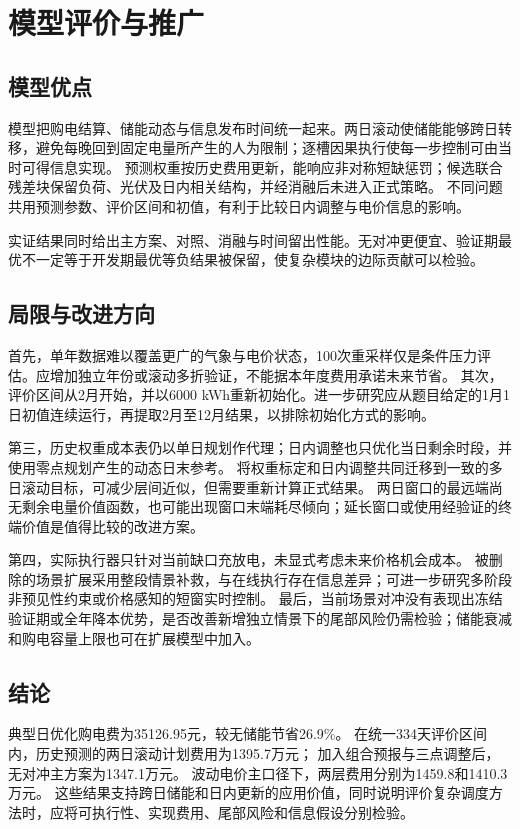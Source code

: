 \section{模型评价与推广}
\subsection{模型优点}
模型把购电结算、储能动态与信息发布时间统一起来。两日滚动使储能能够跨日转移，避免每晚回到固定电量所产生的人为限制；逐槽因果执行使每一步控制可由当时可得信息实现。
预测权重按历史费用更新，能响应非对称短缺惩罚；候选联合残差块保留负荷、光伏及日内相关结构，并经消融后未进入正式策略。
不同问题共用预测参数、评价区间和初值，有利于比较日内调整与电价信息的影响。

实证结果同时给出主方案、对照、消融与时间留出性能。无对冲更便宜、验证期最优不一定等于开发期最优等负结果被保留，使复杂模块的边际贡献可以检验。
\subsection{局限与改进方向}
首先，单年数据难以覆盖更广的气象与电价状态，100次重采样仅是条件压力评估。应增加独立年份或滚动多折验证，不能据本年度费用承诺未来节省。
其次，评价区间从2月开始，并以6000 kWh重新初始化。进一步研究应从题目给定的1月1日初值连续运行，再提取2月至12月结果，以排除初始化方式的影响。

第三，历史权重成本表仍以单日规划作代理；日内调整也只优化当日剩余时段，并使用零点规划产生的动态日末参考。
将权重标定和日内调整共同迁移到一致的多日滚动目标，可减少层间近似，但需要重新计算正式结果。
两日窗口的最远端尚无剩余电量价值函数，也可能出现窗口末端耗尽倾向；延长窗口或使用经验证的终端价值是值得比较的改进方案。

第四，实际执行器只针对当前缺口充放电，未显式考虑未来价格机会成本。
被删除的场景扩展采用整段情景补救，与在线执行存在信息差异；可进一步研究多阶段非预见性约束或价格感知的短窗实时控制。
最后，当前场景对冲没有表现出冻结验证期或全年降本优势，是否改善新增独立情景下的尾部风险仍需检验；储能衰减和购电容量上限也可在扩展模型中加入。
\subsection{结论}
典型日优化购电费为35126.95元，较无储能节省26.9\%。
在统一334天评价区间内，历史预测的两日滚动计划费用为1395.7万元；
加入组合预报与三点调整后，无对冲主方案为1347.1万元。
波动电价主口径下，两层费用分别为1459.8和1410.3万元。
这些结果支持跨日储能和日内更新的应用价值，同时说明评价复杂调度方法时，应将可执行性、实现费用、尾部风险和信息假设分别检验。
